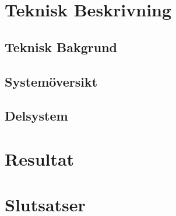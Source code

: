 \documentclass[a4paper]{article}
\begin{document}
\section{Teknisk Beskrivning}

\subsection{Teknisk Bakgrund}

\subsection{Systemöversikt}



\subsection{Delsystem}

\section{Resultat}

\section{Slutsatser}





\end{document}
